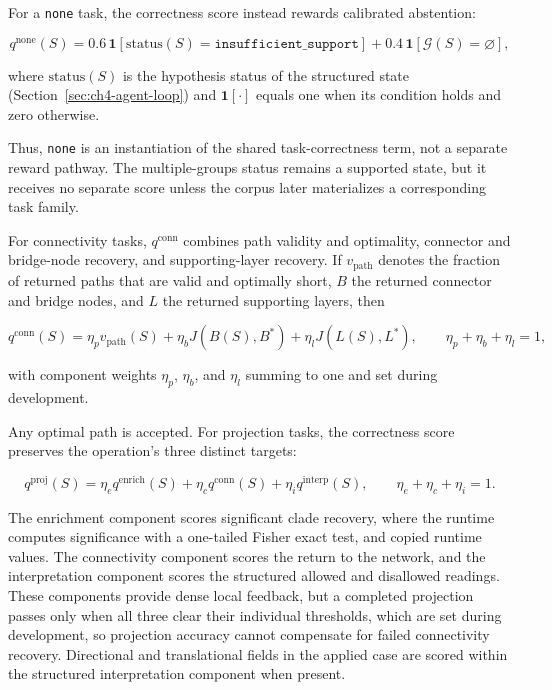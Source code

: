 For a \texttt{none} task, the correctness score instead rewards calibrated abstention:

\begin{equation}
    q^{\mathrm{none}}(S)
    =0.6\,\mathbf{1}[\mathrm{status}(S)=\texttt{insufficient\_support}]
    +0.4\,\mathbf{1}[\mathcal{G}(S)=\varnothing],
\end{equation}

where $\mathrm{status}(S)$ is the hypothesis status of the structured state (Section~\ref{sec:ch4-agent-loop}) and $\mathbf{1}[\cdot]$ equals one when its condition holds and zero otherwise.

Thus, \texttt{none} is an instantiation of the shared task-correctness term, not a separate reward pathway. The multiple-groups status remains a supported state, but it receives no separate score unless the corpus later materializes a corresponding task family.

For connectivity tasks, $q^{\mathrm{conn}}$ combines path validity and optimality, connector and bridge-node recovery, and supporting-layer recovery. If $v_{\mathrm{path}}$ denotes the fraction of returned paths that are valid and optimally short, $B$ the returned connector and bridge nodes, and $L$ the returned supporting layers, then

\begin{equation}
    q^{\mathrm{conn}}(S)
    =\eta_p v_{\mathrm{path}}(S)
    +\eta_b J(B(S),B^*)
    +\eta_l J(L(S),L^*),
    \qquad \eta_p+\eta_b+\eta_l=1,
\end{equation}

with component weights $\eta_p$, $\eta_b$, and $\eta_l$ summing to one and set during development.

Any optimal path is accepted. For projection tasks, the correctness score preserves the operation's three distinct targets:

\begin{equation}
    q^{\mathrm{proj}}(S)
    =\eta_e q^{\mathrm{enrich}}(S)
    +\eta_c q^{\mathrm{conn}}(S)
    +\eta_i q^{\mathrm{interp}}(S),
    \qquad \eta_e+\eta_c+\eta_i=1.
\end{equation}

The enrichment component scores significant clade recovery, where the runtime computes significance with a one-tailed Fisher exact test, and copied runtime values. The connectivity component scores the return to the network, and the interpretation component scores the structured allowed and disallowed readings. These components provide dense local feedback, but a completed projection passes only when all three clear their individual thresholds, which are set during development, so projection accuracy cannot compensate for failed connectivity recovery. Directional and translational fields in the applied case are scored within the structured interpretation component when present.

